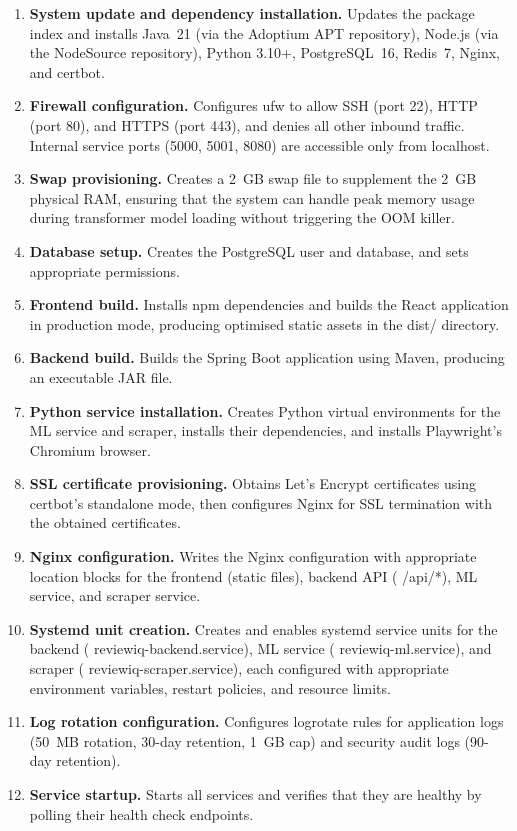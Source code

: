\documentclass[12pt,a4paper,oneside]{report}
\renewcommand{\texttt}[1]{%
  {\ttfamily\hyphenchar\font=45\relax #1}}
\begin{document}
\begin{enumerate}[leftmargin=*]
  \item \textbf{System update and dependency installation.} Updates the
        package index and installs Java~21 (via the Adoptium APT
        repository), Node.js (via the NodeSource repository), Python 3.10+,
        PostgreSQL~16, Redis~7, Nginx, and certbot.
  \item \textbf{Firewall configuration.} Configures \texttt{ufw} to
        allow SSH (port 22), HTTP (port 80), and HTTPS (port 443), and
        denies all other inbound traffic. Internal service ports (5000,
        5001, 8080) are accessible only from localhost.
  \item \textbf{Swap provisioning.} Creates a 2~GB swap file to
        supplement the 2~GB physical RAM, ensuring that the system can
        handle peak memory usage during transformer model loading
        without triggering the OOM killer.
  \item \textbf{Database setup.} Creates the PostgreSQL user and
        database, and sets appropriate permissions.
  \item \textbf{Frontend build.} Installs npm dependencies and builds
        the React application in production mode, producing optimised
        static assets in the \texttt{dist/} directory.
  \item \textbf{Backend build.} Builds the Spring Boot application using
        Maven, producing an executable JAR file.
  \item \textbf{Python service installation.} Creates Python virtual
        environments for the ML service and scraper, installs their
        dependencies, and installs Playwright's Chromium browser.
  \item \textbf{SSL certificate provisioning.} Obtains Let's Encrypt
        certificates using certbot's standalone mode, then configures
        Nginx for SSL termination with the obtained certificates.
  \item \textbf{Nginx configuration.} Writes the Nginx configuration
        with appropriate location blocks for the frontend (static files),
        backend API (\texttt{/api/*}), ML service, and scraper service.
  \item \textbf{Systemd unit creation.} Creates and enables
        \texttt{systemd} service units for the backend
        (\texttt{reviewiq-backend.service}), ML service
        (\texttt{reviewiq-ml.service}), and scraper
        (\texttt{reviewiq-scraper.service}), each configured with
        appropriate environment variables, restart policies, and resource
        limits.
  \item \textbf{Log rotation configuration.} Configures \texttt{logrotate}
        rules for application logs (50~MB rotation, 30-day retention,
        1~GB cap) and security audit logs (90-day retention).
  \item \textbf{Service startup.} Starts all services and verifies
        that they are healthy by polling their health check endpoints.
\end{enumerate}
\end{document}
